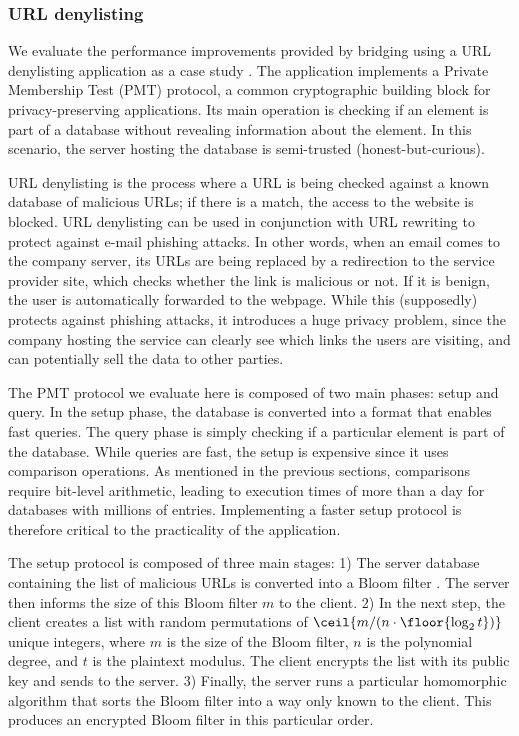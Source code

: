\subsubsection{URL denylisting}
\label{ss:url}


We evaluate the performance improvements provided by bridging using a URL denylisting application as a case study \cite{urldenylist}.
The application implements a Private Membership Test (PMT) protocol, a common cryptographic building block for privacy-preserving applications.
Its main operation is checking if an element is part of a database without revealing information about the element.
In this scenario, the server hosting the database is semi-trusted (honest-but-curious).

URL denylisting is the process where a URL is being checked against a known database of malicious URLs; if there is a match, the access to the website is blocked. URL denylisting can be used in conjunction with URL rewriting to protect against e-mail phishing attacks. In other words, when an email comes to the company server, its URLs are being replaced by a redirection to the service provider site, which checks whether the link is malicious or not. If it is benign, the user is automatically forwarded to the webpage. While this (supposedly) protects against phishing attacks, it introduces a huge privacy problem, since the company hosting the service can clearly see which links the users are visiting, and can potentially sell the data to other parties. 

The PMT protocol we evaluate here is composed of two main phases: setup and query. In the setup phase, the database is converted into a format that enables fast queries. The query phase is simply checking if a particular element is part of the database.
While queries are fast, the setup is expensive since it uses comparison operations. As mentioned in the previous sections, comparisons require bit-level arithmetic, leading to execution times of more than a day for databases with millions of entries. Implementing a faster setup protocol is therefore critical to the practicality of the application. 

The setup protocol is composed of three main stages: 1) The server database containing the list of malicious URLs is converted into a Bloom filter \cite{bloomfilter}. The server then informs the size of this Bloom filter $m$ to the client. 2) In the next step, the client creates a list with random permutations of \mbox{$\ceil{ {m}/({n \cdot \floor{\log_{2}{t}}} ) }$} unique integers, where $m$ is the size of the Bloom filter, $n$ is the polynomial degree, and $t$ is the plaintext modulus. The client encrypts the list with its public key and sends to the server. 3) Finally, the server runs a particular homomorphic algorithm that sorts the Bloom filter into a way only known to the client. This produces an encrypted Bloom filter in this particular order.

